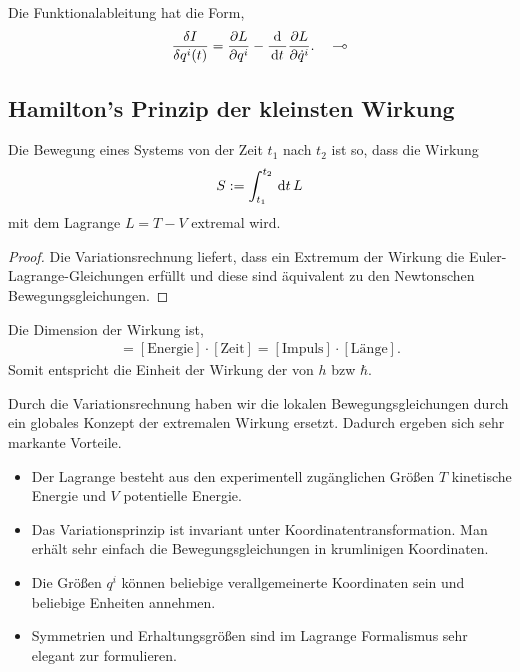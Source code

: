 \begin{bemn}
Die Funktionalableitung hat die Form,
\begin{align*}
\frac{\delta I}{\delta q^i(t)} = \frac{\partial L}{\partial q^i} -
\frac{\mathrm{d}}{\,\mathrm{d} t\,}\frac{\partial L}{\partial \dot{q}^i}.\quad\multimap
\end{align*}
\end{bemn}

\subsection{Hamilton's Prinzip der kleinsten Wirkung}

\begin{propn}
Die Bewegung eines Systems von der Zeit $t_1$ nach $t_2$ ist so, dass die
Wirkung
\begin{align*}
S:= \int_{t_1}^{t_2} \,\mathrm{d} t\, L
\end{align*}
mit dem Lagrange $L=T-V$ extremal wird.\fishhere
\end{propn}
\begin{proof}
Die Variationsrechnung liefert, dass ein Extremum der Wirkung die
Euler-Lagrange-Gleichungen erfüllt und diese sind äquivalent zu den Newtonschen
Bewegungsgleichungen.\qedhere
\end{proof}

\begin{bemn}
Die Dimension der Wirkung ist,
\begin{align*}
[\text{Wirkung}] = [\text{Energie}]\cdot[\text{Zeit}] =
[\text{Impuls}]\cdot[\text{Länge}].
\end{align*}
Somit entspricht die Einheit der Wirkung der von $h$ bzw $\hbar$.\maphere
\end{bemn}

Durch die Variationsrechnung haben wir die lokalen Bewegungsgleichungen durch
ein globales Konzept der extremalen Wirkung ersetzt. Dadurch ergeben sich sehr
markante Vorteile.
\begin{itemize}[label=]
  \item Der Lagrange besteht aus den experimentell zugänglichen Größen $T$
  kinetische Energie und $V$ potentielle Energie.
  \item Das Variationsprinzip ist invariant unter Koordinatentransformation.
  Man erhält sehr einfach die Bewegungsgleichungen in krumlinigen Koordinaten. 
  \item Die Größen $q^i$ können beliebige verallgemeinerte Koordinaten sein 
 und beliebige Enheiten annehmen.
  \item Symmetrien und Erhaltungsgrößen sind im Lagrange Formalismus sehr
  elegant zur formulieren.
\end{itemize}

